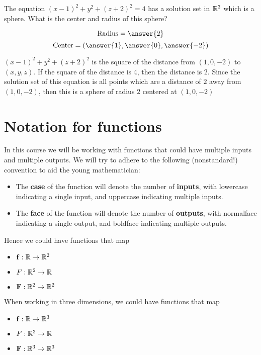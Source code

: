 \documentclass{ximera}
\begin{document}
\begin{question}
  The equation $(x-1)^2+y^2+(z+2)^2 = 4$ has a solution set in
  $\mathbb R^3$ which is a sphere.  What is the center and
  radius of this sphere?
  \begin{prompt}
  \[
  \text{Radius} = \answer{2}
  \]
  \[
  \text{Center} = \left(\answer{1},\answer{0}, \answer{-2} \right)
  \]
  \end{prompt}
  \begin{hint}
    $(x-1)^2+y^2+(z+2)^2$ is the square of the distance from
    $(1,0,-2)$ to $(x,y,z)$.  If the square of the distance is $4$, then
    the distance is $2$.  Since the solution set of this equation is all
    points which are a distance of $2$ away from $(1,0,-2)$, then this
    is a sphere of radius $2$ centered at $(1,0,-2)$
  \end{hint}
\end{question}


\section{Notation for functions}

In this course we will be working with functions that could have multiple
inputs and multiple outputs. We will try to adhere to the following
(nonstandard!) convention to aid the young mathematician:

\begin{itemize}
  \item The \textbf{case} of the function will denote the number of
    \textbf{inputs}, with lowercase indicating a single input, and uppercase
    indicating multiple inputs.
  \item The \textbf{face} of the function will denote the number of
    \textbf{outputs}, with normalface indicating a single output, and
    boldface indicating multiple outputs.
\end{itemize}
Hence we could have functions that map
\begin{itemize}
\item $\mathbf{f}:\mathbb R \to \mathbb R^2$
\item $F:\mathbb R^2\to \mathbb R$
\item $\mathbf{F}:\mathbb R^2 \to \mathbb R^2$
\end{itemize}
When working in three dimensions, we could have functions that map
\begin{itemize}
\item $\mathbf{f}:\mathbb R \to \mathbb R^3$
\item $F:\mathbb R^3\to \mathbb R$
\item $\mathbf{F}:\mathbb R^3 \to \mathbb R^3$
\end{itemize}
\end{document}
